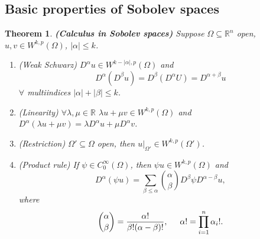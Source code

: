 \documentclass[12pt]{article}
\newtheorem{theorem}{Theorem}[section]
\theoremstyle{definition}
\begin{document}
\subsection{Basic properties of Sobolev spaces}
\begin{theorem}\label{Sobolev_calculus}
\emph{\textbf{(Calculus in Sobolev spaces)}} Suppose $\Omega\subseteq\mathbb{R}^n$ open, $u,v\in W^{k,p}(\Omega)$, $|\alpha|\leq k$.
\begin{enumerate}[label=(\roman*)]
\item\label{Sobolev_calculus_Schwarz} (Weak Schwarz) $D^{\alpha}u\in W^{k-|\alpha|,p}(\Omega)$ and
\[D^{\alpha}(D^{\beta}u)=D^{\beta}(D^{\alpha}U)=D^{\alpha+\beta}u\]
$\forall$ multiindices $|\alpha|+|\beta|\leq k$.

\item\label{Sobolev_calculus_linearity} (Linearity) $\forall\lambda,\mu\in\mathbb{R}$ $\lambda u+\mu v\in W^{k,p}(\Omega)$ and $D^{\alpha}(\lambda u+\mu v)=\lambda D^{\alpha}u+\mu D^{\alpha}v$.

\item\label{Sobolev_calculus_restriction} (Restriction) $\Omega'\subseteq\Omega$ open, then $u|_{\Omega'}\in W^{k,p}(\Omega')$.

\item\label{Sobolev_calculus_product} (Product rule) If $\psi\in C_0^{\infty}(\Omega)$, then $\psi u\in W^{k,p}(\Omega)$ and
\begin{equation}\tag{Leibnitz rule}
D^{\alpha}(\psi u)=\sum_{\beta\leq\alpha}\binom{\alpha}{\beta}D^{\beta}\psi D^{\alpha-\beta}u,
\end{equation}
where
\[\binom{\alpha}{\beta}=\frac{\alpha!}{\beta!(\alpha-\beta)!},\hspace{5mm}\alpha!=\prod_{i=1}^n\alpha_i!.\]
\end{enumerate}
\end{theorem}
\end{document}
